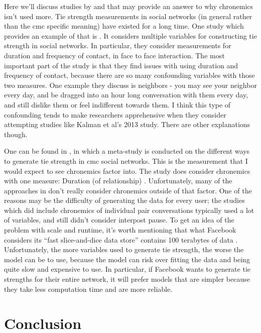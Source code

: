 \documentclass[
  stu]{apa7}
\begin{document}
Here we'll discuss studies by \textcite{marsden84} and
\textcite{liberatore17} that may provide an answer to why chronemics
isn't used more. Tie strength measurements in social networks (in
general rather than the cmc specific meaning) have existed for a long
time. One study which provides an example of that is
\textcite{marsden84}. It considers multiple variables for constructing
tie strength in social networks. In particular, they consider
measurements for duration and frequency of contact, in face to face
interaction. The most important part of the study is that they find
issues with using duration and frequency of contact, because there are
so many confounding variables with those two measures. One example they
discuss is neighbors - you may see your neighbor every day, and be
dragged into an hour long conversation with them every day, and still
dislike them or feel indifferent towards them. I think this type of
confounding tends to make researchers apprehensive when they consider
attempting studies like Kalman et al's 2013 study. There are other
explanations though.

One can be found in \textcite{liberatore17}, in which a meta-study is
conducted on the different ways to generate tie strength in cmc social
networks. This is the measurement that I would expect to see chronemics
factor into. The study does consider chronemics with one measure:
Duration (of relationship) \autocite{liberatore17}. Unfortunately, many
of the approaches in \textcite{liberatore17} don't really consider
chronemics outside of that factor. One of the reasons may be the
difficulty of generating the data for every user; the studies which did
include chronemics of individual pair conversations typically used a lot
of variables, and still didn't consider interpost pause. To get an idea
of the problem with scale and runtime, it's worth mentioning that what
Facebook considers its ``fast slice-and-dice data store'' contains 100
terabytes of data \autocite{bronson14}. Unfortunately, the more
variables used to generate tie strength, the worse the model can be to
use, because the model can risk over fitting the data and being quite
slow and expensive to use. In particular, if Facebook wants to generate
tie strengths for their entire network, it will prefer models that are
simpler because they take less computation time and are more reliable.

\hypertarget{conclusion}{%
\section{Conclusion}\label{conclusion}}
\end{document}
